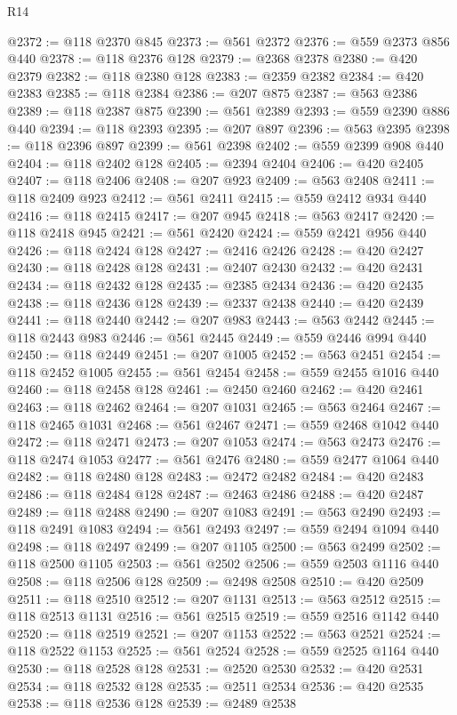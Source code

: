 \begin{lexlean}{R14}
\begin{coremodule}
{{{{{{{{{{{{{{{{{{{{{{{{{{{{{{{{{{{{{{{{{{{{{{{{{{{{{{{{{{{{{{{{{{{{{{{{{{{{{{{{{{@2372 := @118 @2370 @845
@2373 := @561 @2372
@2376 := @559 @2373 @856 @440
@2378 := @118 @2376 @128
@2379 := @2368 @2378
@2380 := @420 @2379
@2382 := @118 @2380 @128
@2383 := @2359 @2382
@2384 := @420 @2383
@2385 := @118 @2384
@2386 := @207 @875
@2387 := @563 @2386
@2389 := @118 @2387 @875
@2390 := @561 @2389
@2393 := @559 @2390 @886 @440
@2394 := @118 @2393
@2395 := @207 @897
@2396 := @563 @2395
@2398 := @118 @2396 @897
@2399 := @561 @2398
@2402 := @559 @2399 @908 @440
@2404 := @118 @2402 @128
@2405 := @2394 @2404
@2406 := @420 @2405
@2407 := @118 @2406
@2408 := @207 @923
@2409 := @563 @2408
@2411 := @118 @2409 @923
@2412 := @561 @2411
@2415 := @559 @2412 @934 @440
@2416 := @118 @2415
@2417 := @207 @945
@2418 := @563 @2417
@2420 := @118 @2418 @945
@2421 := @561 @2420
@2424 := @559 @2421 @956 @440
@2426 := @118 @2424 @128
@2427 := @2416 @2426
@2428 := @420 @2427
@2430 := @118 @2428 @128
@2431 := @2407 @2430
@2432 := @420 @2431
@2434 := @118 @2432 @128
@2435 := @2385 @2434
@2436 := @420 @2435
@2438 := @118 @2436 @128
@2439 := @2337 @2438
@2440 := @420 @2439
@2441 := @118 @2440
@2442 := @207 @983
@2443 := @563 @2442
@2445 := @118 @2443 @983
@2446 := @561 @2445
@2449 := @559 @2446 @994 @440
@2450 := @118 @2449
@2451 := @207 @1005
@2452 := @563 @2451
@2454 := @118 @2452 @1005
@2455 := @561 @2454
@2458 := @559 @2455 @1016 @440
@2460 := @118 @2458 @128
@2461 := @2450 @2460
@2462 := @420 @2461
@2463 := @118 @2462
@2464 := @207 @1031
@2465 := @563 @2464
@2467 := @118 @2465 @1031
@2468 := @561 @2467
@2471 := @559 @2468 @1042 @440
@2472 := @118 @2471
@2473 := @207 @1053
@2474 := @563 @2473
@2476 := @118 @2474 @1053
@2477 := @561 @2476
@2480 := @559 @2477 @1064 @440
@2482 := @118 @2480 @128
@2483 := @2472 @2482
@2484 := @420 @2483
@2486 := @118 @2484 @128
@2487 := @2463 @2486
@2488 := @420 @2487
@2489 := @118 @2488
@2490 := @207 @1083
@2491 := @563 @2490
@2493 := @118 @2491 @1083
@2494 := @561 @2493
@2497 := @559 @2494 @1094 @440
@2498 := @118 @2497
@2499 := @207 @1105
@2500 := @563 @2499
@2502 := @118 @2500 @1105
@2503 := @561 @2502
@2506 := @559 @2503 @1116 @440
@2508 := @118 @2506 @128
@2509 := @2498 @2508
@2510 := @420 @2509
@2511 := @118 @2510
@2512 := @207 @1131
@2513 := @563 @2512
@2515 := @118 @2513 @1131
@2516 := @561 @2515
@2519 := @559 @2516 @1142 @440
@2520 := @118 @2519
@2521 := @207 @1153
@2522 := @563 @2521
@2524 := @118 @2522 @1153
@2525 := @561 @2524
@2528 := @559 @2525 @1164 @440
@2530 := @118 @2528 @128
@2531 := @2520 @2530
@2532 := @420 @2531
@2534 := @118 @2532 @128
@2535 := @2511 @2534
@2536 := @420 @2535
@2538 := @118 @2536 @128
@2539 := @2489 @2538
}}}}}}}}}}}}}}}}}}}}}}}}}}}}}}}}}}}}}}}}}}}}}}}}}}}}}}}}}}}}}}}}}}}}}}}}}}}}}}}}}}
\end{coremodule}
\end{lexlean}
